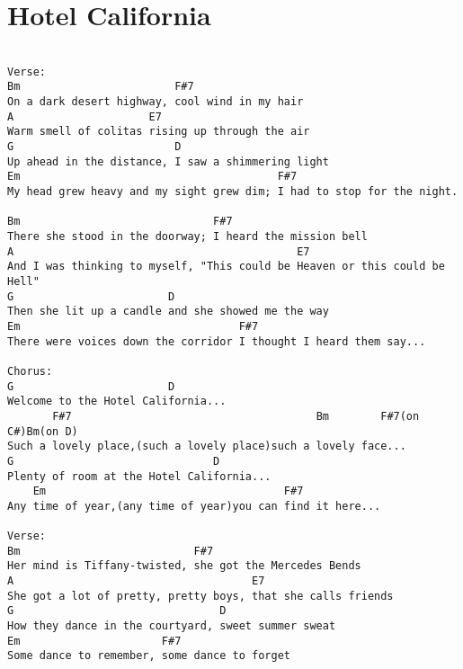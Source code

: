 \documentclass[leqno]{memoir}
\begin{document}
\chapter{Hotel California}
\begin{verbatim}

Verse:
Bm                        F#7
On a dark desert highway, cool wind in my hair
A                     E7
Warm smell of colitas rising up through the air
G                         D
Up ahead in the distance, I saw a shimmering light
Em                                        F#7
My head grew heavy and my sight grew dim; I had to stop for the night.

Bm                              F#7
There she stood in the doorway; I heard the mission bell
A                                            E7
And I was thinking to myself, "This could be Heaven or this could be Hell"
G                        D
Then she lit up a candle and she showed me the way
Em                                  F#7
There were voices down the corridor I thought I heard them say...

Chorus:
G                        D 
Welcome to the Hotel California... 
       F#7                                      Bm        F#7(on C#)Bm(on D)
Such a lovely place,(such a lovely place)such a lovely face...
G                               D
Plenty of room at the Hotel California... 
    Em                                     F#7
Any time of year,(any time of year)you can find it here...

Verse:
Bm                           F#7
Her mind is Tiffany-twisted, she got the Mercedes Bends
A                                     E7
She got a lot of pretty, pretty boys, that she calls friends
G                                D
How they dance in the courtyard, sweet summer sweat
Em                      F#7
Some dance to remember, some dance to forget
\end{verbatim}
\newpage
\end{document}
